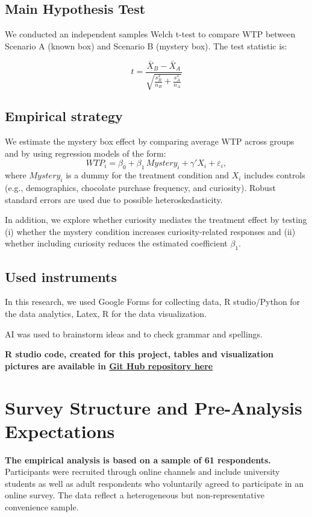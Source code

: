 \documentclass{article}
\begin{document}
\subsection{Main Hypothesis Test}

We conducted an independent samples Welch t-test to compare WTP between Scenario A (known box) and Scenario B (mystery box). The test statistic is:

\begin{equation}
t = \frac{\bar{X}_B - \bar{X}_A}{\sqrt{\frac{s_B^2}{n_B} + \frac{s_A^2}{n_A}}}
\end{equation}

\subsection{Empirical strategy}
We estimate the mystery box effect by comparing average WTP across groups and by using regression models of the form:
\[
WTP_i = \beta_0 + \beta_1 \, Mystery_i + \gamma'X_i + \varepsilon_i,
\]
where $Mystery_i$ is a dummy for the treatment condition and $X_i$ includes controls (e.g., demographics, chocolate purchase frequency, and curiosity). Robust standard errors are used due to possible heteroskedasticity.

In addition, we explore whether curiosity mediates the treatment effect by testing (i) whether the mystery condition increases curiosity-related responses and (ii) whether including curiosity reduces the estimated coefficient $\beta_1$.

\subsection{Used instruments}

 In this research, we used Google Forms for collecting data, R studio/Python for the data analytics, Latex, R for the data visualization. 

AI was used to brainstorm ideas and to check grammar and spellings. 

\textbf{R studio code, created for this project, tables and visualization pictures are available in \href{https://github.com/Margaar/Behavioral-Economics-}{Git Hub repository here}}

\section{Survey Structure and Pre-Analysis Expectations}

\textbf{The empirical analysis is based on a sample of 61 respondents.} Participants were recruited through online channels and include university students as well as adult respondents who voluntarily agreed to participate in an online survey. The data reflect a heterogeneous but non-representative convenience sample.
\end{document}
